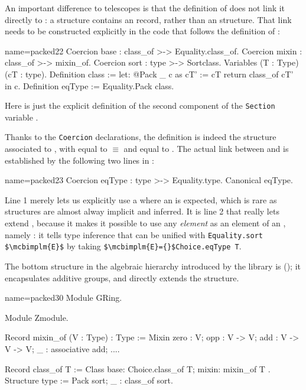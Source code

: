 An important difference to telescopes is that the definition of
 does not link it directly to : a
 structure contains an  record, rather
than an  structure. That link needs to be constructed
explicitly in the code that follows the definition of :

\begin{coq}{name=packed22}{}
Coercion base : class_of >-> Equality.class_of.
Coercion mixin : class_of >-> mixin_of.
Coercion sort : type >-> Sortclass.
Variables (T : Type) (cT : type).
Definition class := let: @Pack _ c as cT' := cT return class_of cT' in c.
Definition eqType := Equality.Pack class.
\end{coq}

Here  is just the explicit definition of the second component
of the \lstinline/Section/ variable . 

Thanks to the \lstinline/Coercion/ declarations, the  definition is
indeed the  structure associated to , with 
equal to ${}\equiv{}$ and  equal to .
The actual link between  and  is established
by the following two lines in :

\begin{coq}{name=packed23}{}
Coercion eqType : type >-> Equality.type.
Canonical eqType.
\end{coq}

Line 1 merely lets us explicitly use a  where an
 is expected, which is rare as structures are almost alway
implicit and inferred.  It is line 2 that really lets 
extend , because it makes it possible to use any
\emph{element}  as an element of an ,
namely : it tells type inference that 
can be unified with \lstinline/Equality.sort $\mcbimplm{E}$/ by taking
\lstinline/$\mcbimplm{E}={}$Choice.eqType T/.

The bottom structure in the \mcbMC{} algebraic hierarchy introduced by
the  library is  (); it
encapsulates additive groups, and directly extends the 
structure.

\begin{coq}{name=packed30}{}
Module GRing.
  
Module Zmodule.

Record mixin_of (V : Type) : Type := Mixin {
  zero : V; opp : V -> V; add : V -> V -> V;
  _ : associative add;
  ...}.

Record class_of T := Class { base: Choice.class_of T; mixin: mixin_of T }.
Structure type := Pack {sort; _ : class_of sort}.
\end{coq}

